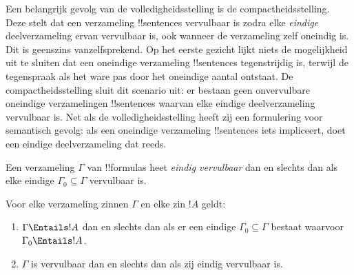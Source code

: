 \documentclass[../../../include/open-logic-section]{subfiles}
\begin{document}
      {}
      {}


Een belangrijk gevolg van de volledigheidsstelling is de
compactheidsstelling. Deze stelt dat een verzameling !!{sentence}s
vervulbaar is zodra elke \emph{eindige} deelverzameling ervan vervulbaar
is, ook wanneer de verzameling zelf oneindig is. Dit is geenszins
vanzelfsprekend. Op het eerste gezicht lijkt niets de mogelijkheid uit
te sluiten dat een oneindige verzameling !!{sentence}s tegenstrijdig is,
terwijl de tegenspraak als het ware pas door het oneindige aantal
ontstaat. De compactheidsstelling sluit dit scenario uit: er bestaan
geen onvervulbare oneindige verzamelingen !!{sentence}s waarvan elke
eindige deelverzameling vervulbaar is. Net als de volledigheidsstelling
heeft zij een formulering voor semantisch gevolg: als een oneindige
verzameling !!{sentence}s iets impliceert, doet een eindige
deelverzameling dat reeds.

\begin{defn}
  Een verzameling $\Gamma$ van !!{formula}s heet \emph{eindig
  vervulbaar} dan en slechts dan als elke eindige
  $\Gamma_0 \subseteq \Gamma$ vervulbaar is.
\end{defn}

\begin{thm}[Compactheidsstelling]
Voor elke verzameling zinnen $\Gamma$ en elke zin $!A$ geldt:
\begin{enumerate}
  \item $\Gamma \Entails !A$ dan en slechts dan als er een eindige
    $\Gamma_0 \subseteq \Gamma$ bestaat waarvoor
    $\Gamma_0 \Entails !A$.
  \item $\Gamma$ is vervulbaar dan en slechts dan als zij eindig
    vervulbaar is.
\end{enumerate}
\end{thm}
\end{document}
